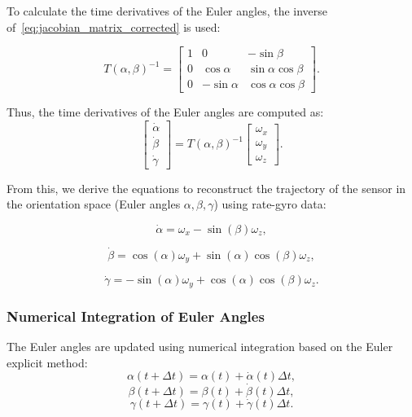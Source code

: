 \documentclass[12pt]{article}
\begin{document}
To calculate the time derivatives of the Euler angles, the inverse of~\ref{eq:jacobian_matrix_corrected} is used:

\begin{equation}
\label{eq:jacobian_inverse}
T(\alpha, \beta)^{-1} =
\begin{bmatrix}
1 & 0 & -\sin\beta \\
0 & \cos\alpha & \sin\alpha \cos\beta \\
0 & -\sin\alpha & \cos\alpha \cos\beta
\end{bmatrix}.
\end{equation}

Thus, the time derivatives of the Euler angles are computed as:
\begin{equation}
\label{eq:euler_derivatives}
\begin{bmatrix}
\dot{\alpha} \\
\dot{\beta} \\
\dot{\gamma}
\end{bmatrix}
=
T(\alpha, \beta)^{-1}
\begin{bmatrix}
\omega_x \\
\omega_y \\
\omega_z
\end{bmatrix}.
\end{equation}

From this, we derive the equations to reconstruct the trajectory of the sensor in the orientation space (Euler angles \(\alpha, \beta, \gamma\)) using rate-gyro data:

\begin{equation}
\label{eq:alpha_corrected}
\dot{\alpha} = \omega_x - \sin(\beta) \omega_z ,
\end{equation}

\begin{equation}
\label{eq:beta_corrected}
\dot{\beta} = \cos(\alpha) \omega_y + \sin(\alpha) \cos(\beta) \omega_z,
\end{equation}

\begin{equation}
\label{eq:gamma_corrected}
\dot{\gamma} = -\sin(\alpha) \omega_y + \cos(\alpha) \cos(\beta) \omega_z.
\end{equation}


\subsubsection{Numerical Integration of Euler Angles}

The Euler angles are updated using numerical integration based on the Euler explicit method:
\begin{equation}
\label{eq:integration_alpha}
\alpha(t + \Delta t) = \alpha(t) + \dot{\alpha}(t) \Delta t,
\end{equation}
\begin{equation}
\label{eq:integration_beta}
\beta(t + \Delta t) = \beta(t) + \dot{\beta}(t) \Delta t,
\end{equation}
\begin{equation}
\label{eq:integration_gamma}
\gamma(t + \Delta t) = \gamma(t) + \dot{\gamma}(t) \Delta t.
\end{equation}
\end{document}
